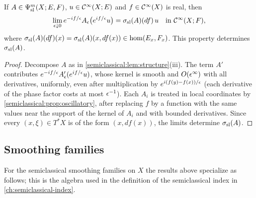 \begin{proposition}\label{semiclassical:prop:oscillatory-X}
  If $A\in\Psi^{m}_{\mathrm{sl}}(X;E,F)$, $u\in\mathcal{C}^\infty(X;E)$ and $f\in\mathcal{C}^\infty(X)$ is real, then
  \begin{equation*}
    \lim_{\epsilon\downarrow0}e^{-if/\epsilon}A_\epsilon\bigl(e^{if/\epsilon}u\bigr)=\sigma_{\mathrm{sl}}(A)(df)\,u
    \quad\text{in }\mathcal{C}^\infty(X;F),
  \end{equation*}
  where $\sigma_{\mathrm{sl}}(A)(df)(x)=\sigma_{\mathrm{sl}}(A)(x,df(x))\in\hom(E_x,F_x)$. This property
  determines $\sigma_{\mathrm{sl}}(A)$.
\end{proposition}
\begin{proof}
  Decompose $A$ as in \cref{semiclassical:lem:structure}(iii). The term $A'$
  contributes $e^{-if/\epsilon}A'_\epsilon(e^{if/\epsilon}u)$, whose kernel is smooth and
  $O(\epsilon^\infty)$ with all derivatives, uniformly, even after multiplication by
  $e^{i(f(y)-f(x))/\epsilon}$ (each derivative of the phase factor costs at most
  $\epsilon^{-1}$). Each $A_i$ is treated in local coordinates by
  \cref{semiclassical:prop:oscillatory}, after replacing $f$ by a function with
  the same values near the support of the kernel of $A_i$ and with bounded
  derivatives. Since every $(x,\xi)\in T^*X$ is of the form $(x,df(x))$, the limits
  determine $\sigma_{\mathrm{sl}}(A)$.
\end{proof}

\subsection{Smoothing families}
For the semiclassical smoothing families on $X$ the results above specialize as
follows; this is the algebra used in the definition of the semiclassical index
in \cref{ch:semiclassical-index}.

